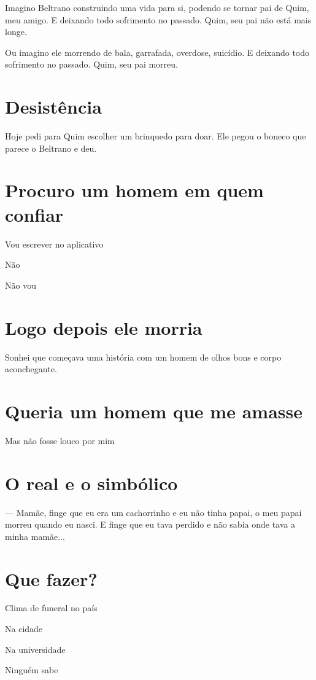 Imagino Beltrano construindo uma vida para si, podendo se tornar pai de
Quim, meu amigo. E deixando todo sofrimento no passado. Quim, seu pai
não está mais longe.

Ou imagino ele morrendo de bala, garrafada, overdose, suicídio. E
deixando todo sofrimento no passado. Quim, seu pai morreu.

\chapter{Desistência}\label{desistuxeancia}

Hoje pedi para Quim escolher um brinquedo para doar. Ele pegou o boneco
que parece o Beltrano e deu.

{\parindent0pt\parskip1pt\raggedright

\chapter{Procuro um homem em quem
confiar}\label{procuro-um-homem-em-quem-confiar}

Vou escrever no aplicativo

Não

Não vou

\chapter{Logo depois ele morria}\label{logo-depois-ele-morria}

Sonhei que começava uma história com um homem de olhos bons e corpo
aconchegante.

\chapter{Queria um homem que me
amasse}\label{queria-um-homem-que-me-amasse}

Mas não fosse louco por mim}


\chapter{O real e o simbólico}

--- Mamãe, finge que eu era um cachorrinho e eu não tinha papai, o meu
papai morreu quando eu nasci. E finge que eu tava perdido e não sabia
onde tava a minha mamãe...

{\parindent0pt\parskip1pt\raggedright

\chapter{Que fazer?}\label{que-fazer}

Clima de funeral no país

Na cidade\medskip

Na universidade

Ninguém sabe}

